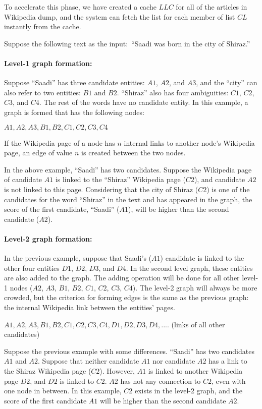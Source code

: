 \documentclass{article}
\begin{document}
To accelerate this phase, we have created a cache $LLC$ for all of the articles in Wikipedia dump, and the system can fetch the list for each member of list $CL$ instantly from the cache.

Suppose the following text as the input:\
``Saadi was born in the city of Shiraz.''

\paragraph{Level-1 graph formation:} Suppose ``Saadi'' has three candidate entities: $A1$, $A2$, and $A3$, and the ``city'' can also refer to two entities: $B1$ and $B2$. ``Shiraz'' also has four ambiguities: $C1$, $C2$, $C3$, and $C4$. The rest of the words have no candidate entity. In this example, a graph is formed that has the following nodes:

$A1, A2, A3, B1, B2, C1, C2, C3, C4$

If the Wikipedia page of a node has $n$ internal links to another node's Wikipedia page, an edge of value $n$ is created between the two nodes.

In the above example, ``Saadi'' has two candidates. Suppose the Wikipedia page of candidate $A1$ is linked to the ``Shiraz'' Wikipedia page ($C2$), and candidate $A2$ is not linked to this page. Considering that the city of Shiraz ($C2$) is one of the candidates for the word ``Shiraz'' in the text and has appeared in the graph, the score of the first candidate, ``Saadi'' ($A1$), will be higher than the second candidate ($A2$).

\paragraph{Level-2 graph formation:} In the previous example, suppose that Saadi's ($A1$) candidate is linked to the other four entities $D1$, $D2$, $D3$, and $D4$. In the second level graph, these entities are also added to the graph. The adding operation will be done for all other level-1 nodes ($A2$, $A3$, $B1$, $B2$, $C1$, $C2$, $C3$, $C4$). The level-2 graph will always be more crowded, but the criterion for forming edges is the same as the previous graph: the internal Wikipedia link between the entities' pages.

$A1, A2, A3, B1, B2, C1, C2, C3, C4, D1, D2, D3, D4, ....$ (links of all other candidates)

Suppose the previous example with some differences. ``Saadi'' has two candidates $A1$ and $A2$. Suppose that neither candidate $A1$ nor candidate $A2$ has a link to the Shiraz Wikipedia page ($C2$). However, $A1$ is linked to another Wikipedia page $D2$, and $D2$ is linked to $C2$. $A2$ has not any connection to $C2$, even with one node in between. In this example, $C2$ exists in the level-2 graph, and the score of the first candidate $A1$ will be higher than the second candidate $A2$.
\end{document}
